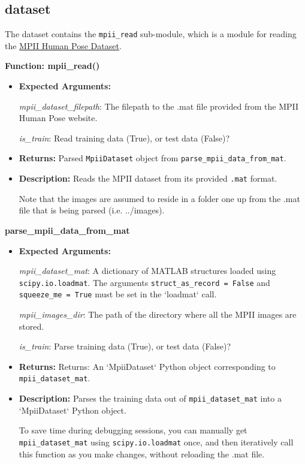 \documentclass{scrreprt}
\begin{document}
\subsection{dataset}

The dataset contains the \verb|mpii_read| sub-module, which is a module for
reading the \href{http://human-pose.mpi-inf.mpg.de/}{MPII Human Pose Dataset}.

\textbf{Function: mpii\_read()}

\begin{itemize}
        \item \textbf{Expected Arguments:}

        \textit{mpii\_dataset\_filepath}: The filepath to the .mat file provided from the
            MPII Human Pose website.

        \textit{is\_train}: Read training data (True), or test data (False)?

        \item \textbf{Returns:} Parsed \verb|MpiiDataset| object from
                \verb|parse_mpii_data_from_mat|.

        \item \textbf{Description:} Reads the MPII dataset from its provided
                \verb|.mat| format.

                Note that the images are assumed to reside in a folder one up from the .mat
                file that is being parsed (i.e. ../images).
\end{itemize}

\textbf{parse\_mpii\_data\_from\_mat}

\begin{itemize}
        \item \textbf{Expected Arguments:}

        \textit{mpii\_dataset\_mat}: A dictionary of MATLAB structures loaded using
            \verb|scipy.io.loadmat|. The arguments \verb|struct_as_record = False| and
            \verb|squeeze_me = True| must be set in the `loadmat` call.

        \textit{mpii\_images\_dir}: The path of the directory where all the
                MPII images are stored.

        \textit{is\_train}: Parse training data (True), or test data (False)?

        \item \textbf{Returns:} Returns: An `MpiiDataset` Python object
                corresponding to \verb|mpii_dataset_mat|.

        \item \textbf{Description:} Parses the training data out of
                \verb|mpii_dataset_mat| into a `MpiiDataset` Python object.

                To save time during debugging sessions, you can manually get
                \verb|mpii_dataset_mat| using \verb|scipy.io.loadmat| once, and
                then iteratively call this function as you make changes,
                without reloading the .mat file.
\end{itemize}
\end{document}
